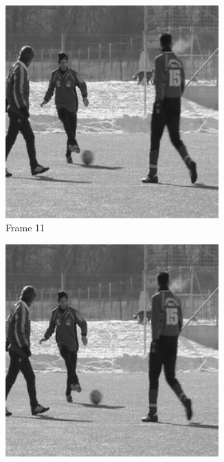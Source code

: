 \begin{figure}
\centering
  \begin{subfigure}{0.35\textwidth}
    \includegraphics[width=0.9\textwidth]{Chapter3/Images/frame_11.png}
    \caption{Frame 11}
  \end{subfigure}
  \begin{subfigure}{0.35\textwidth}
    \includegraphics[width=0.9\textwidth]{Chapter3/Images/frame_12.png}

\end{subfigure}
\end{figure}
